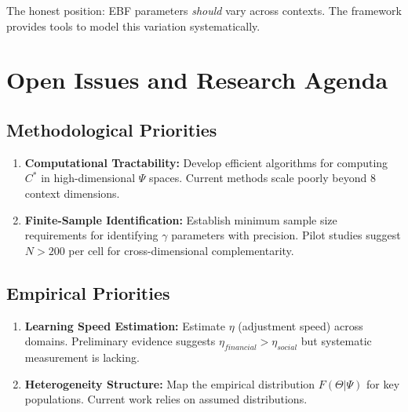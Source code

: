 The honest position: EBF parameters \textit{should} vary across contexts.
The framework provides tools to model this variation systematically.


\section{Open Issues and Research Agenda}
\label{sec:az-open}

\subsection{Methodological Priorities}

\begin{enumerate}
    \item \textbf{Computational Tractability:} Develop efficient algorithms for
    computing $C^*$ in high-dimensional $\Psi$ spaces. Current methods scale poorly
    beyond 8 context dimensions.

    \item \textbf{Finite-Sample Identification:} Establish minimum sample size
    requirements for identifying $\gamma$ parameters with precision. Pilot studies
    suggest $N > 200$ per cell for cross-dimensional complementarity.
\end{enumerate}

\subsection{Empirical Priorities}

\begin{enumerate}
    \item \textbf{Learning Speed Estimation:} Estimate $\eta$ (adjustment speed)
    across domains. Preliminary evidence suggests $\eta_{financial} > \eta_{social}$
    but systematic measurement is lacking.

    \item \textbf{Heterogeneity Structure:} Map the empirical distribution $F(\Theta | \Psi)$
    for key populations. Current work relies on assumed distributions.
\end{enumerate}

